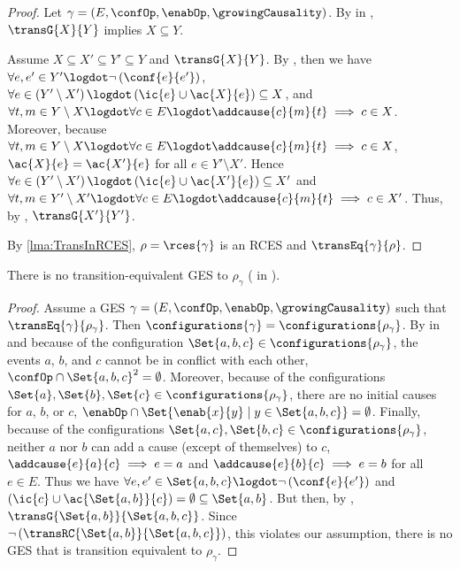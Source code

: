 \documentclass[runningheads,a4paper]{llncs}
\begin{document}
\begin{proof}
	Let $ \gamma = \left( E, \confOp, \enabOp, \growingCausality \right) $.	By  in \cite{dynamicCausality15}, $ \transG{X}{Y} $ implies $ X \subseteq Y $.
	
	Assume $ X \subseteq X' \subseteq Y' \subseteq Y $ and $ \transG{X}{Y} $.
	By , then we have $ \forall e, e' \in Y' \logdot \neg \left( \conf{e}{e'} \right) $,	$ \forall e \in \left( Y' \setminus X' \right) \logdot \left( \ic{e} \cup \ac{X}{e} \right) \subseteq X $, and $ \forall t, m \in Y\setminus X\logdot\forall c\in E \logdot \addcause{c}{m}{t} \implies c\in X $.	Moreover, because $ \forall t, m \in Y\setminus X\logdot\forall c\in E \logdot \addcause{c}{m}{t} \implies c\in X $, $ \ac{X}{e} = \ac{X'}{e} $ for all $ e \in Y' \setminus X' $.	Hence $ \forall e \in \left( Y' \setminus X' \right) \logdot \left( \ic{e} \cup \ac{X'}{e} \right) \subseteq X' $ and $ \forall t, m \in Y'\setminus X'\logdot\forall c\in E \logdot \addcause{c}{m}{t} \implies c\in X' $.	Thus, by , $ \transG{X'}{Y'} $.
	
	By \lem\ref{lma:TransInRCES}, $\rho=\rces{\gamma} $ is an RCES and $ \transEq{\gamma}{\rho}$.
\end{proof}
\begin{lemma}\label{lma:GESinRCESstrictly}
	There is no transition-equivalent GES to $\rho_{\gamma}$ (\cf {} in \cite{dynamicCausality15}).
\end{lemma}
\begin{proof}
	Assume a GES $ \gamma = \left( E, \confOp, \enabOp, \growingCausality \right) $ such that $ \transEq {\gamma}{\rho_{\gamma}} $. Then $ \configurations{\gamma} = \configurations{\rho_{\gamma}} $.	By  in \cite{dynamicCausality15} and because of the configuration $ \Set{ a, b, c } \in \configurations{\rho_{\gamma}} $, the events $ a $, $ b $, and $ c $ cannot be in conflict with each other, \ie $ \confOp \cap \Set{ a,	b, c }^2 = \emptyset $.	Moreover, because of the configurations $ \Set{ a }, \Set{ b }, \Set{ c } \in \configurations{\rho_{\gamma}} $, there are no initial causes for $ a $, $ b $, or $ c $, \ie $ \enabOp \cap \Set{ \enab{x}{y} \mid y \in \Set{ a, b, c } } = \emptyset $. Finally, because of the configurations $ \Set{ a, c }, \Set{ b, c } \in \configurations{\rho_{\gamma}} $, neither $ a $ nor $ b $ can add a cause (except of themselves) to $ c $, \ie $ \addcause{e}{a}{c} \implies e = a $ and $ \addcause{e}{b}{c} \implies e = b $ for all $ e \in E $.	Thus we have $ \forall e, e' \in \Set{ a, b, c } \logdot \neg \left( \conf{e}{e'} \right) $ and $ \left( \ic{c} \cup \ac{\Set{ a, b }}{c} \right) = \emptyset \subseteq \Set{ a, b } $.	But then, by , $ \transG{\Set{ a, b }}{\Set{ a, b, c }} $. Since $ \neg \left( \transRC{\Set{ a, b }}{\Set{ a, b, c }} \right) $, this violates our assumption, \ie there is no GES that is transition equivalent to $ \rho_{\gamma} $.
\end{proof}
\end{document}

